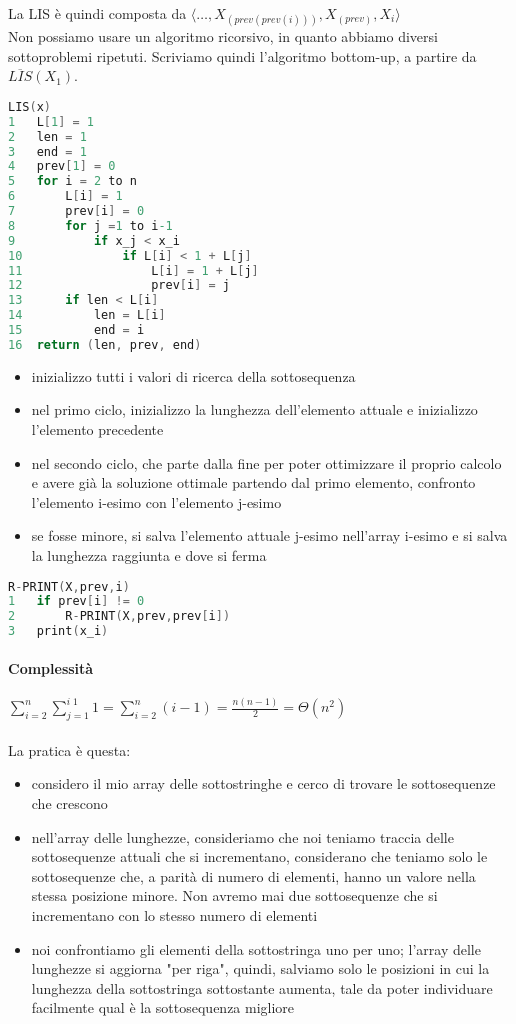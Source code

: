 \newpage
La LIS è quindi composta da $\langle \dots, X_(prev(prev(i))), X_(prev), X_i \rangle$ \\
Non possiamo usare un algoritmo ricorsivo, in quanto abbiamo diversi sottoproblemi ripetuti.
Scriviamo quindi l'algoritmo bottom-up, a partire da $\overline{LIS}(X_1)$.
\begin{mdframed}
\begin{lstlisting}[language=C]
LIS(x)
1   L[1] = 1
2   len = 1
3   end = 1
4   prev[1] = 0
5   for i = 2 to n
6       L[i] = 1
7       prev[i] = 0
8       for j =1 to i-1
9           if x_j < x_i
10              if L[i] < 1 + L[j]
11                  L[i] = 1 + L[j]
12                  prev[i] = j
13      if len < L[i]
14          len = L[i]
15          end = i
16  return (len, prev, end)
\end{lstlisting}
\end{mdframed}
\begin{itemize}
    \item inizializzo tutti i valori di ricerca della sottosequenza
    \item nel primo ciclo, inizializzo la lunghezza dell'elemento attuale e inizializzo l'elemento precedente
    \item nel secondo ciclo, che parte dalla fine per poter ottimizzare il proprio calcolo e avere già la soluzione ottimale partendo dal primo elemento, confronto l'elemento i-esimo con l'elemento j-esimo
    \item se fosse minore, si salva l'elemento attuale j-esimo nell'array i-esimo e si salva la lunghezza raggiunta e dove si ferma
\end{itemize}
\begin{mdframed}
\begin{lstlisting}[language=C]
R-PRINT(X,prev,i)
1   if prev[i] != 0
2       R-PRINT(X,prev,prev[i])
3   print(x_i)
\end{lstlisting}
\end{mdframed}
\paragraph{Complessità} $\sum_{i=2}^n \sum_{j=1}^{i\;1}1 = \sum_{i=2}^n (i-1) = \frac{n(n-1)}{2} = \Theta(n^2)$ \\~\\
La pratica è questa:
\begin{itemize}
    \item considero il mio array delle sottostringhe e cerco di trovare le sottosequenze che crescono
    \item nell’array delle lunghezze, consideriamo che noi teniamo traccia delle sottosequenze attuali che si incrementano, considerano che teniamo solo le sottosequenze che, a parità di numero di elementi, hanno un valore nella stessa posizione minore. Non avremo mai due sottosequenze che si incrementano con lo stesso numero di elementi
    \item noi confrontiamo gli elementi della sottostringa uno per uno; l'array delle lunghezze si aggiorna "per riga", quindi, salviamo solo le posizioni in cui la lunghezza della sottostringa sottostante aumenta, tale da poter individuare facilmente qual è la sottosequenza migliore
\end{itemize}

\newpage